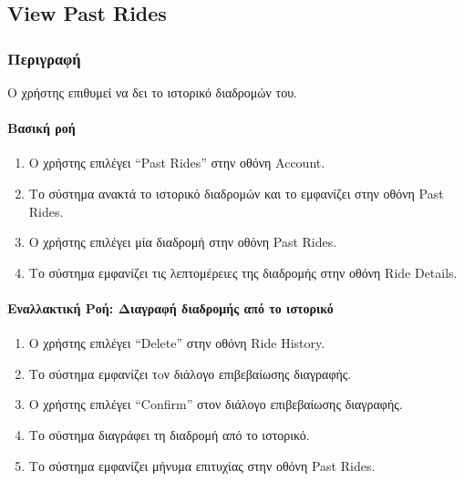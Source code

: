 \hypertarget{view-past-rides}{%
\subsection{View Past Rides}\label{view-past-rides}}

\hypertarget{ux3c0ux3b5ux3c1ux3b9ux3b3ux3c1ux3b1ux3c6ux3ae}{%
\subsubsection{Περιγραφή}\label{ux3c0ux3b5ux3c1ux3b9ux3b3ux3c1ux3b1ux3c6ux3ae}}

Ο χρήστης επιθυμεί να δει το ιστορικό διαδρομών του.

\hypertarget{ux3b2ux3b1ux3c3ux3b9ux3baux3ae-ux3c1ux3bfux3ae}{%
\paragraph{Βασική
ροή}\label{ux3b2ux3b1ux3c3ux3b9ux3baux3ae-ux3c1ux3bfux3ae}}

\begin{enumerate}
\def\labelenumi{\arabic{enumi}.}
\tightlist
\item
  Ο χρήστης επιλέγει ``Past Rides'' στην οθόνη Account.
\item
  Το σύστημα ανακτά το ιστορικό διαδρομών και το εμφανίζει στην οθόνη
  Past Rides.
\item
  Ο χρήστης επιλέγει μία διαδρομή στην οθόνη Past Rides.
\item
  Το σύστημα εμφανίζει τις λεπτομέρειες της διαδρομής στην οθόνη Ride
  Details.
\end{enumerate}

\hypertarget{ux3b5ux3bdux3b1ux3bbux3bbux3b1ux3baux3c4ux3b9ux3baux3ae-ux3c1ux3bfux3ae-ux3b4ux3b9ux3b1ux3b3ux3c1ux3b1ux3c6ux3ae-ux3b4ux3b9ux3b1ux3b4ux3c1ux3bfux3bcux3aeux3c2-ux3b1ux3c0ux3cc-ux3c4ux3bf-ux3b9ux3c3ux3c4ux3bfux3c1ux3b9ux3baux3cc}{%
\paragraph{Εναλλακτική Ροή: Διαγραφή διαδρομής από το
ιστορικό}\label{ux3b5ux3bdux3b1ux3bbux3bbux3b1ux3baux3c4ux3b9ux3baux3ae-ux3c1ux3bfux3ae-ux3b4ux3b9ux3b1ux3b3ux3c1ux3b1ux3c6ux3ae-ux3b4ux3b9ux3b1ux3b4ux3c1ux3bfux3bcux3aeux3c2-ux3b1ux3c0ux3cc-ux3c4ux3bf-ux3b9ux3c3ux3c4ux3bfux3c1ux3b9ux3baux3cc}}

\begin{enumerate}
\def\labelenumi{\arabic{enumi}.}
\setcounter{enumi}{4}
\tightlist
\item
  Ο χρήστης επιλέγει ``Delete'' στην οθόνη Ride History.
\item
  Το σύστημα εμφανίζει τoν διάλογο επιβεβαίωσης διαγραφής.
\item
  Ο χρήστης επιλέγει ``Confirm'' στον διάλογο επιβεβαίωσης διαγραφής.
\item
  Το σύστημα διαγράφει τη διαδρομή από το ιστορικό.
\item
  Το σύστημα εμφανίζει μήνυμα επιτυχίας στην οθόνη Past Rides.
\end{enumerate}

